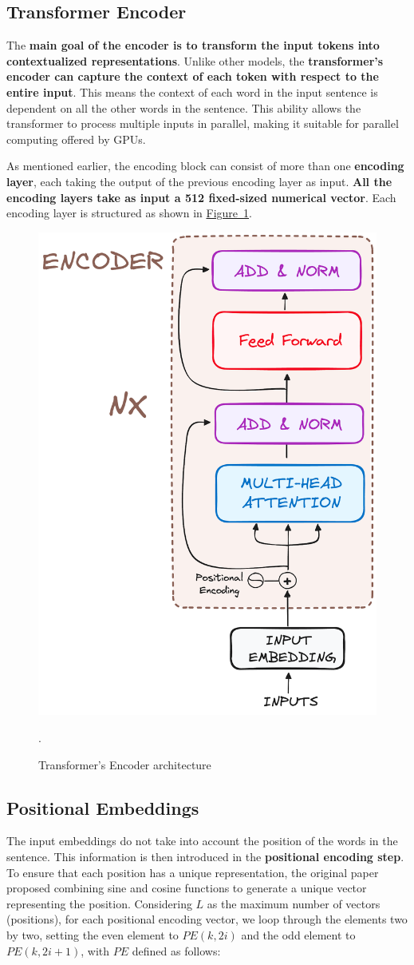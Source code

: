 \documentclass[12pt]{article}
\begin{document}
\subsection{Transformer Encoder}
The \textbf{main goal of the encoder is to transform the input tokens into contextualized representations}. 
Unlike other models, the \textbf{transformer's encoder can capture the context of each token with respect to 
the entire input}. This means the context of each word in the input sentence is dependent on all the other 
words in the sentence. This ability allows the transformer to process multiple inputs in parallel, making 
it suitable for parallel computing offered by GPUs.

As mentioned earlier, the encoding block can consist of more than one \textbf{encoding layer}, each taking 
the output of the previous encoding layer as input. \textbf{All the encoding layers take as input a 512 
fixed-sized numerical vector}. Each encoding layer is structured as shown in 
\hyperref[fig:transformer_encoder]{Figure~\ref*{fig:transformer_encoder}}.

\begin{figure}
    \centering
    \includegraphics[width=.4\textwidth]{Images/transformer_encoder_architecture.png}
    \caption{Transformer's Encoder architecture}.
    \label{fig:transformer_encoder}
\end{figure}

\subsection{Positional Embeddings}
The input embeddings do not take into account the position of the words in the sentence. This information is 
then introduced in the \textbf{positional encoding step}. To ensure that each position has a unique 
representation, the original paper proposed combining sine and cosine functions to generate a unique vector
representing the position. Considering $L$ as the maximum number of vectors (positions), for each positional 
encoding vector, we loop through the elements two by two, setting the even element to $PE(k, 2i)$ and the 
odd element to $PE(k, 2i + 1)$, with $PE$ defined as follows:
\end{document}
